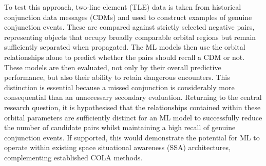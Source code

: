 To test this approach, two-line element (TLE) data is taken from historical conjunction data messages (CDMs) and used to construct examples of genuine conjunction events. These are compared against strictly selected negative pairs, representing objects that occupy broadly comparable orbital regions but remain sufficiently separated when propagated. The ML models then use the orbital relationships alone to predict whether the pairs should recall a CDM or not. These models are then evaluated, not only by their overall predictive performance, but also their ability to retain dangerous encounters. This distinction is essential because a missed conjunction is considerably more consequential than an unnecessary secondary evaluation. 
Returning to the central research question, it is hypothesised that the relationships contained within these orbital parameters are sufficiently distinct for an ML model to successfully reduce the number of candidate pairs whilst maintaining a high recall of genuine conjunction events. If supported, this would demonstrate the potential for ML to operate within existing space situational awareness (SSA) architectures, complementing established COLA methods.
